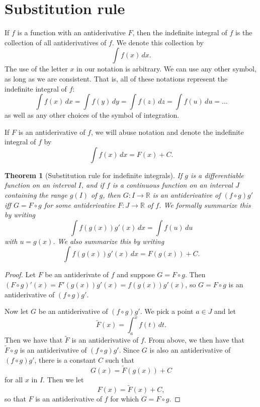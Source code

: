 \documentclass{article}
\theoremstyle{plain}
\newtheorem{theorem}{Theorem}
\begin{document}
\section{Substitution rule}
\begin{definition}
	If $f$ is a function with an antiderivative $F$, then the indefinite integral of $f$ is the collection of all antiderivatives of $f$.
	We denote this collection by
	\begin{equation}
		\int f(x)\,dx.
	\end{equation}
	The use of the letter $x$ in our notation is arbitrary.
	We can use any other symbol, as long as we are consistent.
	That is, all of these notations represent the indefinite integral of $f$:
	\begin{equation}
		\int f(x)\,dx = \int f(y)\,dy = \int f(z)\,dz = \int f(u)\,du = \dots
	\end{equation}
	as well as any other choices of the symbol of integration.

	If $F$ is an antiderivative of $f$, we will abuse notation and denote the indefinite integral of $f$ by
	\begin{equation}
		\int f(x)\,dx = F(x) + C.
	\end{equation}
\end{definition}
\begin{theorem}[Substitution rule for indefinite integrals]
	If $g$ is a differentiable function on an interval $I$, and if $f$ is a continuous function on an interval $J$ containing the range $g(I)$ of $g$, then
	$G : I \to \mathbb R$ is an antiderivative of $(f\circ g)g'$ iff $G = F \circ g$ for some antiderivative $F : J \to \mathbb R$ of $f$.
	We formally summarize this by writing
	\begin{equation}
		\int f(g(x))g'(x)\,dx = \int f(u)\,du
	\end{equation}
	with $u = g(x)$.
	We also summarize this by writing
	\begin{equation}
		\int f(g(x))g'(x)\,dx = F(g(x)) + C.
	\end{equation}
\end{theorem}
\begin{proof}
	Let $F$ be an antiderivate of $f$ and suppose $G = F\circ g$.
	Then $(F\circ g)'(x) = F'(g(x))g'(x) = f(g(x))g'(x)$, so $G = F \circ g$ is an antiderivative of $(f \circ g)g'$.

	Now let $G$ be an antiderivative of $(f\circ g)g'$.
	We pick a point $a \in J$ and let
	\begin{equation}
		\widetilde F(x) = \int_a^x f(t)\,dt.
	\end{equation}
	Then we have that $\widetilde F$ is an antiderivative of $f$.
	From above, we then have that $\widetilde F \circ g$ is an antiderivative of $(f\circ g)g'$.
	Since $G$ is also an antiderivative of $(f\circ g)g'$, there is a constant $C$ such that
	\begin{equation}
		G(x) = \widetilde F(g(x)) + C
	\end{equation}
	for all $x$ in $I$.
	Then we let
	\begin{equation}
		F(x) = \widetilde F(x) + C,
	\end{equation}
	so that $F$ is an antiderivative of $f$ for which $G = F \circ g$.
\end{proof}
\end{document}
